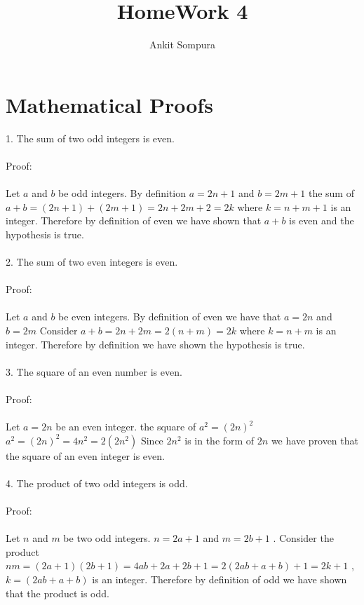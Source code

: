 \documentclass[11pt]{article}
\title{HomeWork 4}
\author{Ankit Sompura}
\begin{document}
\maketitle

\section{Mathematical Proofs}

	1.  The sum of two odd integers is even. \\\\
Proof: \\\\
Let $a$
 and $b$
 be odd integers. By definition $a = 2n + 1$ 
and $ b = 2m +1 $
the sum of $ a + b = (2n + 1) + (2m + 1) = 2n +2m + 2 = 2k$
where $k = n + m + 1$ 
is an integer. Therefore by definition of even we have shown that $a + b$ is even and the hypothesis is true.\\\\
	2.  The sum of two even integers is even. \\\\
Proof: \\\\
Let $a$
and $b$
be even integers. By definition of even we have that $a = 2n$
and $b = 2m$
Consider $a + b = 2n + 2m = 2(n+m) = 2k$
where $k = n + m$
is an integer. Therefore by definition we have shown the hypothesis is true.\\\\
	3.  The square of an even number is even. \\\\ 
Proof: \\\\
 Let $a = 2n$ 
 be an even integer. the square of $ a^2 = (2n)^2$
 $a^2 = (2n)^2 = 4n^2 = 2(2n^2)$
Since $2n^2$
 is in the form of $2n$
  we have proven that the square of an even integer is even.\\\\
 	4.  The product of two odd integers is odd. \\\\
Proof: \\\\
Let $n$
and $m$
be two odd integers. $n = 2a + 1$
and $m = 2b + 1$
. Consider the product $nm = (2a + 1)(2b + 1) = 4ab + 2a +2b + 1 = 2 (2ab + a + b) + 1 = 2k + 1$
, $ k = (2ab + a + b)$
is an integer. Therefore by definition of odd we have shown that the product is odd.\\\\
\end{document}
